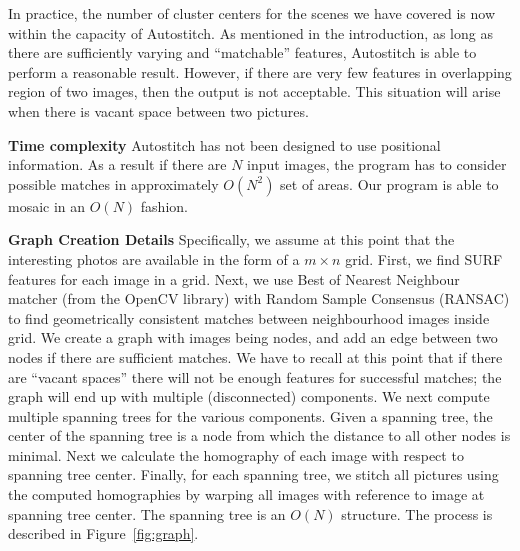 \documentclass[10pt,twocolumn,letterpaper]{article}
\begin{document}
In practice, the number of cluster centers for the scenes we have
covered is now within the capacity of Autostitch.  As mentioned in the
introduction, as long as there are sufficiently varying and
``matchable'' features, Autostitch is able to perform a reasonable
result.  However, if there are very few features in overlapping region
of two images, then the output is not acceptable. This situation will
arise when there is vacant space between two pictures.

{\bf Time complexity} Autostitch has not been designed
to use positional information. As a result if there are $N$ input
images, the program has to consider possible matches in approximately
$O(N^2)$ set of areas.  Our program is able to mosaic in an $O(N)$
fashion.

{\bf Graph Creation Details}
Specifically, we assume at this point that the interesting photos are
available in the form of a $m \times n$ grid. First, we find SURF
\cite{Bay} features for each image in a grid. Next, we use Best of
Nearest Neighbour matcher (from the OpenCV library) with Random Sample
Consensus (RANSAC) \cite{Fischler1981} to find geometrically
consistent matches between neighbourhood images inside grid.  We
create a graph with images being nodes, and add an edge between two
nodes if there are sufficient matches. We have to recall at this point
that if there are ``vacant spaces'' there will not be enough features
for successful matches; the graph will end up with multiple
(disconnected) components.  We next compute multiple spanning trees
for the various components. Given a spanning tree, the center of the
spanning tree is a node from which the distance to all other nodes is
minimal. Next we calculate the homography of each image with respect
to spanning tree center.  Finally, for each spanning tree, we stitch
all pictures using the computed homographies by warping all images
with reference to image at spanning tree center. The spanning tree is
an $O(N)$ structure. The process is described in
Figure~\ref{fig:graph}.
\end{document}
